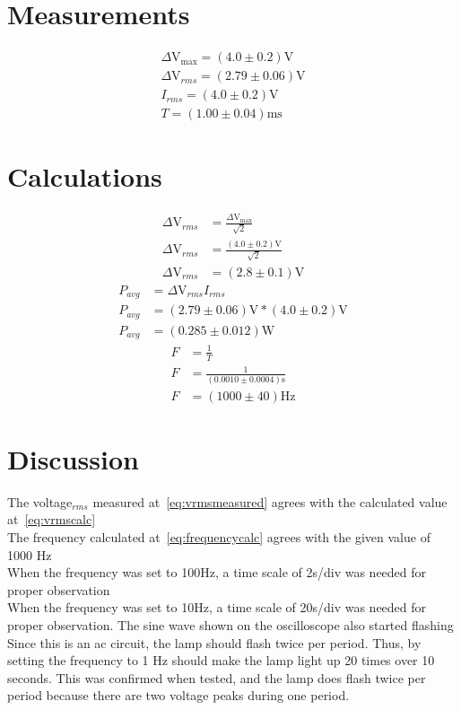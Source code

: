\documentclass{report}
\begin{document}
\section{Measurements}

\begin{gather}
    \Delta\si{\volt}_{\max}=(4.0\pm0.2)\si{\volt}\\
    \Delta\si{\volt}_{rms}=(2.79\pm0.06)\si{\volt} \label{eq:vrmsmeasured}\\
    I_{rms}=(4.0\pm0.2)\si{\volt}\\ 
    T=(1.00\pm0.04)\si{\milli\second}
\end{gather}

\section{Calculations}
\begin{align}
    \Delta\si{\volt}_{rms}&=\frac{\Delta\si{\volt}_{\max}}{\sqrt{2}} \nonumber\\
    \Delta\si{\volt}_{rms}&=\frac{(4.0\pm0.2)\si{\volt}}{\sqrt{2}}\nonumber\\
    \Delta\si{\volt}_{rms}&=(2.8\pm0.1)\si{\volt} \label{eq:vrmscalc}
\end{align}
\begin{align}
    P_{avg}&=\Delta\si{\volt}_{rms}I_{rms}\nonumber\\
    P_{avg}&=(2.79\pm0.06)\si{\volt} * (4.0\pm0.2)\si{\volt} \nonumber\\ 
    P_{avg}&=(0.285\pm0.012)\si{\watt}
\end{align}
\begin{align}
    F&=\frac{1}{T} \nonumber\\
    F &=\frac{1}{(0.0010\pm 0.0004) \si{\second} }\nonumber\\ 
    F &=(1000\pm 40)\si{\hertz} \label{eq:frequencycalc}
\end{align}

\section{Discussion}
The voltage$_{rms}$ measured at~\eqref{eq:vrmsmeasured} agrees with the calculated value at~\eqref{eq:vrmscalc}\\
The frequency calculated at~\eqref{eq:frequencycalc} agrees with the given value of 1000 \si{\hertz}\\
When the frequency was set to 100\si{\hertz}, a time scale of 2\si{\milli}\si{\second}/div was needed for proper observation\\
When the frequency was set to 10\si{\hertz}, a time scale of 20\si{\milli}\si{\second}/div was needed for proper observation. The sine wave shown on the oscilloscope also started flashing\\
Since this is an ac circuit, the lamp should flash twice per period. Thus, by setting the frequency to 1 \si{\hertz} should make the lamp light up 20 times over 10 seconds. This was confirmed when tested, and the lamp does flash twice per period because there are two voltage peaks during one period.
\end{document}

